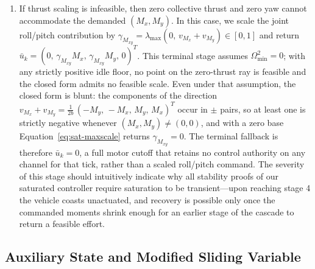 \documentclass[conf]{new-aiaa}
\begin{document}
\begin{enumerate}
\item If thrust scaling is infeasible, then zero collective thrust and zero yaw cannot accommodate the demanded $(M_x, M_y)$. In this case, we scale the joint roll/pitch contribution by $\gamma_{M_{xy}} = \lambda_{\max}(0,\, v_{M_x} + v_{M_y}) \in [0, 1]$ and return $\bar u_k = (0,\, \gamma_{M_{xy}} M_x,\, \gamma_{M_{xy}} M_y,\, 0)^T$. This terminal stage assumes $\Omega^2_{\min} = 0$; with any strictly positive idle floor, no point on the zero-thrust ray is feasible and the closed form admits no feasible scale. Even under that assumption, the closed form is blunt: the components of the direction $v_{M_x} + v_{M_y} = \tfrac{1}{2 b}\,(-M_y,\, -M_x,\, M_y,\, M_x)^T$ occur in $\pm$ pairs, so at least one is strictly negative whenever $(M_x, M_y) \neq (0, 0)$, and with a zero base Equation~\ref{eq:sat-maxscale} returns $\gamma_{M_{xy}} = 0$. The terminal fallback is therefore $\bar u_k = 0$, a full motor cutoff that retains no control authority on any channel for that tick, rather than a scaled roll/pitch command. The severity of this stage should intuitively indicate why all stability proofs of our saturated controller require saturation to be transient---upon reaching stage 4 the vehicle coasts unactuated, and recovery is possible only once the commanded moments shrink enough for an earlier stage of the cascade to return a feasible effort.
\end{enumerate}

\subsection{Auxiliary State and Modified Sliding Variable}
\label{sec:sat-aux}
\end{document}
